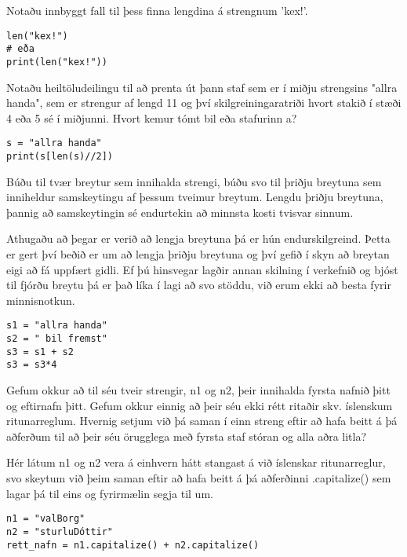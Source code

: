 \begin{exercise}\label{str4-5}
	Notaðu innbyggt fall til þess finna lengdina á strengnum 'kex!'.
\end{exercise}
\begin{Answer}[ref={str4-5}]
\begin{lstlisting}
len("kex!")
# eða
print(len("kex!"))\end{lstlisting}
\end{Answer}

\begin{exercise}\label{str5}
	Notaðu heiltöludeilingu til að prenta út þann staf sem er í miðju strengsins "allra handa", sem er strengur af lengd 11 og því skilgreiningaratriði hvort stakið í stæði 4 eða 5 sé í miðjunni.
	Hvort kemur tómt bil eða stafurinn a?
\end{exercise}
\begin{Answer}[ref={str5}]
\begin{lstlisting}
s = "allra handa"
print(s[len(s)//2])\end{lstlisting}
\end{Answer}

\begin{exercise}\label{str6}
	Búðu til tvær breytur sem innihalda strengi, búðu svo til þriðju breytuna sem inniheldur samskeytingu af þessum tveimur breytum.
	Lengdu þriðju breytuna, þannig að samskeytingin sé endurtekin að minnsta kosti tvisvar sinnum.
\end{exercise}
\begin{Answer}[ref={str6}]
	Athugaðu að þegar er verið að lengja breytuna þá er hún endurskilgreind.
	Þetta er gert því beðið er um að lengja þriðju breytuna og því gefið í skyn að breytan eigi að fá uppfært gidli.
	Ef þú hinsvegar lagðir annan skilning í verkefnið og bjóst til fjórðu breytu þá er það líka í lagi að svo stöddu, við erum ekki að besta fyrir minnisnotkun.
\begin{lstlisting}
s1 = "allra handa"
s2 = " bil fremst"
s3 = s1 + s2
s3 = s3*4\end{lstlisting}
\end{Answer}

\begin{exercise}\label{str7}
Gefum okkur að til séu tveir strengir, n1 og n2, þeir innihalda fyrsta nafnið þitt og eftirnafn þitt.
Gefum okkur einnig að þeir séu ekki rétt ritaðir skv. íslenskum ritunarreglum.
Hvernig setjum við þá saman í einn streng eftir að hafa beitt á þá aðferðum til að þeir séu örugglega með fyrsta staf stóran og alla aðra litla?
\end{exercise}
\begin{Answer}[ref={str7}]
	Hér látum n1 og n2 vera á einhvern hátt stangast á við íslenskar ritunarreglur, svo skeytum við þeim saman eftir að hafa beitt á þá aðferðinni .capitalize() sem lagar þá til eins og fyrirmælin segja til um.
\begin{lstlisting}
n1 = "valBorg"
n2 = "sturluDóttir"
rett_nafn = n1.capitalize() + n2.capitalize()\end{lstlisting}
\end{Answer}


